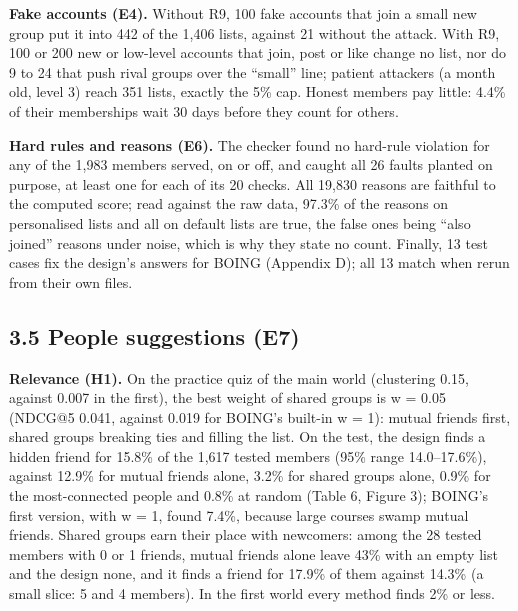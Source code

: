 \documentclass[11pt,letterpaper]{article}
\begin{document}
\textbf{Fake accounts (E4).} Without R9, 100 fake accounts that join a small new group put it into 442 of the
1,406 lists, against 21 without the attack. With R9, 100 or 200 new or low-level accounts that join, post or
like change no list, nor do 9 to 24 that push rival groups over the ``small'' line; patient attackers (a month
old, level 3) reach 351 lists, exactly the 5\% cap. Honest members pay little: 4.4\% of their memberships wait
30 days before they count for others.

\textbf{Hard rules and reasons (E6).} The checker found no hard-rule violation for any of the 1,983 members
served, on or off, and caught all 26 faults planted on purpose, at least one for each of its 20 checks. All
19,830 reasons are faithful to the computed score; read against the raw data, 97.3\% of the reasons on
personalised lists and all on default lists are true, the false ones being ``also joined'' reasons under
noise, which is why they state no count. Finally, 13 test cases fix the design's answers for BOING (Appendix
D); all 13 match when rerun from their own files.

\subsection{3.5 People suggestions (E7)}

\textbf{Relevance (H1).} On the practice quiz of the main world (clustering 0.15, against 0.007 in the first),
the best weight of shared groups is w = 0.05 (NDCG@5 0.041, against 0.019 for BOING's built-in w = 1): mutual
friends first, shared groups breaking ties and filling the list. On the test, the design finds a hidden friend
for 15.8\% of the 1,617 tested members (95\% range 14.0--17.6\%), against 12.9\% for mutual friends alone,
3.2\% for shared groups alone, 0.9\% for the most-connected people and 0.8\% at random (Table 6, Figure 3);
BOING's first version, with w = 1, found 7.4\%, because large courses swamp mutual friends. Shared groups earn
their place with newcomers: among the 28 tested members with 0 or 1 friends, mutual friends alone leave 43\%
with an empty list and the design none, and it finds a friend for 17.9\% of them against 14.3\% (a small
slice: 5 and 4 members). In the first world every method finds 2\% or less.
\end{document}
